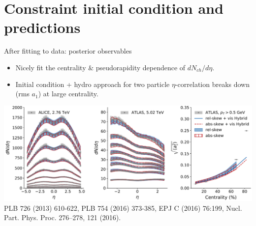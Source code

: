 \documentclass[11pt]{beamer}
\begin{document}
\section{Constraint initial condition and predictions}
\begin{frame}{After fitting to data: posterior observables}
\begin{itemize}
\item Nicely fit the centrality $\&$ pseudorapidity dependence of $dN_{ch}/d\eta$.
\item  Initial condition + hydro approach for two particle $\eta$-correlation breaks down (rms $a_1$) at large centrality.
\end{itemize}
\begin{center}
\includegraphics[width=\textwidth]{post_obs.pdf}\\
\tiny  	PLB 726 (2013) 610-622, PLB 754 (2016) 373-385, EPJ C (2016) 76:199, Nucl. Part. Phys. Proc. 276–278, 121 (2016).
\end{center}
\end{frame}
\end{document}
